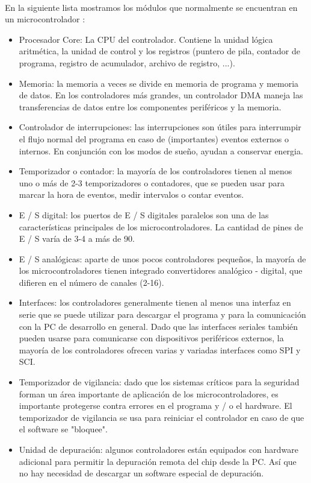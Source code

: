 \paragraph{}
En la siguiente lista mostramos los módulos que normalmente se encuentran en un microcontrolador \citep{MarcoTeoricoMicrocontrolador}:
\begin{itemize}
	\item Procesador Core: La CPU del controlador. Contiene la unidad lógica aritmética, la unidad de control y los registros (puntero de pila, contador de programa, registro de acumulador, archivo de registro, ...).
    \item Memoria: la memoria a veces se divide en memoria de programa y memoria de datos. En los controladores más grandes, un controlador DMA maneja las transferencias de datos entre los componentes periféricos y la memoria.
    \item Controlador de interrupciones: las interrupciones son útiles para interrumpir el flujo normal del programa en caso de (importantes) eventos externos o internos. En conjunción con los modos de sueño, ayudan a conservar energia.
    \item Temporizador o contador: la mayoría de los controladores tienen al menos uno o más de 2-3 temporizadores o contadores, que se pueden usar para marcar la hora de eventos, medir intervalos o contar eventos.
    \item E / S digital: los puertos de E / S digitales paralelos son una de las características principales de los microcontroladores. La cantidad de pines de E / S varía de 3-4 a más de 90.
    \item E / S analógicas: aparte de unos pocos controladores pequeños, la mayoría de los microcontroladores tienen integrado convertidores analógico - digital, que difieren en el número de canales (2-16). 
    \item Interfaces: los controladores generalmente tienen al menos una interfaz en serie que se puede utilizar para descargar el programa y para la comunicación con la PC de desarrollo en general. Dado que las interfaces seriales también pueden usarse para comunicarse con dispositivos periféricos externos, la mayoría de los controladores ofrecen varias y variadas interfaces como SPI y SCI.
    \item Temporizador de vigilancia: dado que los sistemas críticos para la seguridad forman un área importante de aplicación de los microcontroladores, es importante protegerse contra errores en el programa y / o el hardware. El temporizador de vigilancia se usa para reiniciar el controlador en caso de que el software se "bloquee".
    \item Unidad de depuración: algunos controladores están equipados con hardware adicional para permitir la depuración remota del chip desde la PC. Así que no hay necesidad de descargar un software especial de depuración.
\end{itemize}


